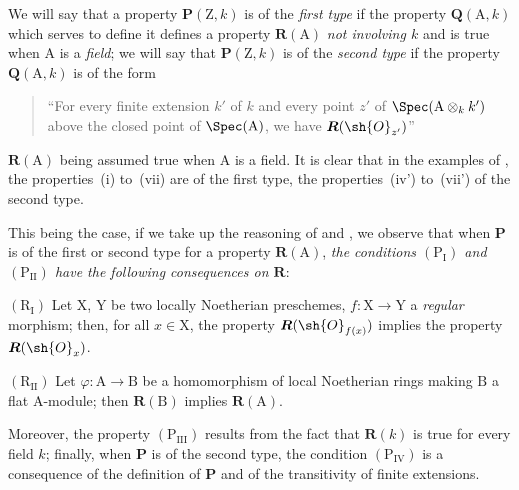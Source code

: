 \begin{env}[7.3.10]
\label{IV.7.3.10}
We will say that a property $\boldsymbol{P}(\mathrm{Z},k)$ is of the \emph{first type} if the property $\boldsymbol{Q}(\mathrm{A},k)$ which serves to define it defines a property $\boldsymbol{R}(\mathrm{A})$ \emph{not involving $k$} and is true when $\mathrm{A}$ is a \emph{field}; we will say that $\boldsymbol{P}(\mathrm{Z},k)$ is of the \emph{second type} if the property $\boldsymbol{Q}(\mathrm{A},k)$ is of the form
\begin{quote}
``For every finite extension $k'$ of $k$ and every point $z'$ of $\Spec(\mathrm{A}\otimes_k k')$ above the closed point of $\Spec(\mathrm{A})$, we have $\boldsymbol{R}(\sh{O}_{z'})$''
\end{quote}
$\boldsymbol{R}(\mathrm{A})$ being assumed true when $\mathrm{A}$ is a field.
It is clear that in the examples of , the properties~(i) to~(vii) are of the first type, the properties~(iv') to~(vii') of the second type.

This being the case, if we take up the reasoning of  and , we observe that when $\boldsymbol{P}$ is of the first or second type for a property $\boldsymbol{R}(\mathrm{A})$, \emph{the conditions $(\mathrm{P_I})$ and $(\mathrm{P_{II}})$ have the following consequences on $\boldsymbol{R}$}:

$(\mathrm{R_I})$ Let $\mathrm{X}$, $\mathrm{Y}$ be two locally Noetherian preschemes, $f:\mathrm{X}\to\mathrm{Y}$ a \emph{regular} morphism; then, for all $x\in\mathrm{X}$, the property $\boldsymbol{R}(\sh{O}_{f(x)})$ implies the property $\boldsymbol{R}(\sh{O}_x)$.

$(\mathrm{R_{II}})$ Let $\varphi:\mathrm{A}\to\mathrm{B}$ be a homomorphism of local Noetherian rings making $\mathrm{B}$ a flat $\mathrm{A}$-module; then $\boldsymbol{R}(\mathrm{B})$ implies $\boldsymbol{R}(\mathrm{A})$.

Moreover, the property $(\mathrm{P_{III}})$ results from the fact that $\boldsymbol{R}(k)$ is true for every field $k$; finally, when $\boldsymbol{P}$ is of the second type, the condition $(\mathrm{P_{IV}})$ is a consequence of the definition of $\boldsymbol{P}$ and of the transitivity of finite extensions.
\end{env}

